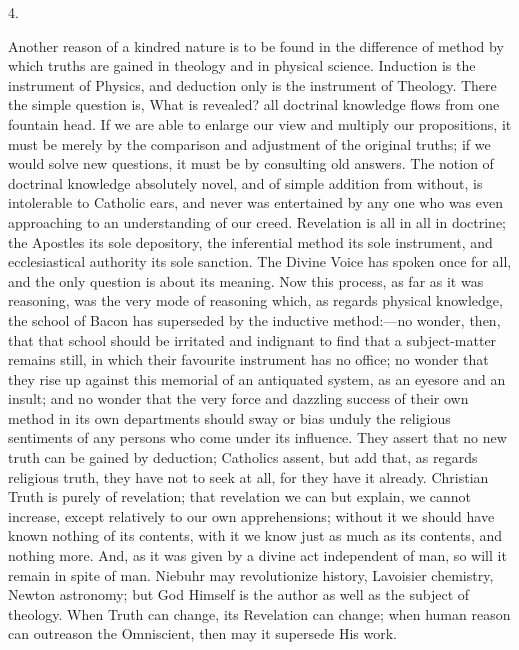 4.

Another reason of a kindred nature is to be found in the difference
of method by which truths are gained in theology and in physical
science. Induction is the instrument of Physics, and deduction only is
the instrument of Theology. There the simple question is, What is
revealed? all doctrinal knowledge flows from one fountain head. If we
are able to enlarge our view and multiply our propositions, it must be
merely by the comparison and adjustment of the original truths; if we
would solve new questions, it must be by consulting old answers. The
notion of doctrinal knowledge absolutely novel, and of simple addition
from without, is intolerable to Catholic ears, and never was
entertained by any one who was even approaching to an understanding of
our creed. Revelation is all in all in doctrine; the Apostles its sole
depository, the inferential method its sole instrument, and
ecclesiastical authority its sole sanction. The Divine Voice has
spoken once for all, and the only question is about its meaning. Now
this process, as far as it was reasoning, was the very mode of
reasoning which, as regards physical knowledge, the school of Bacon
has superseded by the inductive method:—no wonder, then, that that
school should be irritated and indignant to find that a subject-matter
remains still, in which their favourite instrument has no office; no
wonder that they rise up against this memorial of an antiquated
system, as an eyesore and an insult; and no wonder that the very force
and dazzling success of their own method in its own departments should
sway or bias unduly the religious sentiments of any persons who come
under its influence. They assert that no new truth can be gained by
deduction; Catholics assent, but add that, as regards religious truth,
they have not to seek at all, for they have it already. Christian
Truth is purely of revelation; that revelation we can but explain, we
cannot increase, except relatively to our own apprehensions;
without it we should have known nothing of its contents, with it we
know just as much as its contents, and nothing more. And, as it was
given by a divine act independent of man, so will it remain in spite
of man. Niebuhr may revolutionize history, Lavoisier chemistry, Newton
astronomy; but God Himself is the author as well as the subject of
theology. When Truth can change, its Revelation can change; when human
reason can outreason the Omniscient, then may it supersede His work.

